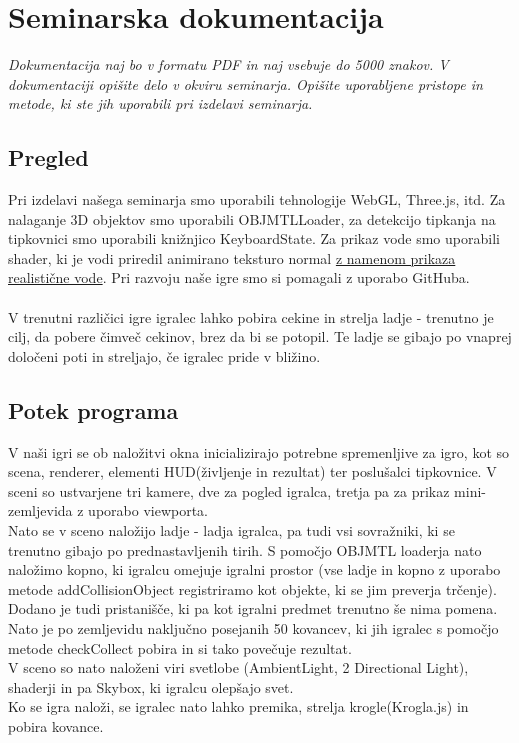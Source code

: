 \documentclass[a4paper]{article}
\begin{document}
\section{Seminarska dokumentacija}
\textit{Dokumentacija naj bo v formatu PDF in naj vsebuje do 5000 znakov. V dokumentaciji opišite delo v okviru seminarja. Opišite uporabljene pristope in metode, ki ste jih uporabili pri izdelavi seminarja. }

\subsection{Pregled}
Pri izdelavi našega seminarja smo uporabili tehnologije WebGL, Three.js\cite{wiki:Three.js}, itd. Za nalaganje 3D objektov smo uporabili OBJMTLLoader, za detekcijo tipkanja na tipkovnici smo uporabili knižnjico KeyboardState. Za prikaz vode smo uporabili shader, ki je vodi priredil animirano teksturo normal \href{http://github.com/jbouny/ocean}{z namenom prikaza realistične vode}.
Pri razvoju naše igre smo si pomagali z uporabo GitHuba. \\
\\
V trenutni različici igre igralec lahko pobira cekine in strelja ladje - trenutno je cilj, da pobere čimveč cekinov, brez da bi se potopil. Te ladje se gibajo po vnaprej določeni poti in streljajo, če igralec pride v bližino.


\subsection{Potek programa}
V naši igri se ob naložitvi okna inicializirajo potrebne spremenljive za igro, kot so scena, renderer, elementi HUD(življenje in rezultat) ter poslušalci tipkovnice. V sceni so ustvarjene tri kamere, dve za pogled igralca, tretja pa za prikaz mini-zemljevida z uporabo viewporta. \\
Nato se v sceno naložijo ladje - ladja igralca, pa tudi vsi sovražniki, ki se trenutno gibajo po prednastavljenih tirih. S pomočjo OBJMTL loaderja nato naložimo kopno, ki igralcu omejuje igralni prostor (vse ladje in kopno z uporabo metode addCollisionObject registriramo kot objekte, ki se jim preverja trčenje). Dodano je tudi pristanišče, ki pa kot igralni predmet trenutno še nima pomena. Nato je po zemljevidu naključno posejanih 50 kovancev, ki jih igralec s pomočjo metode checkCollect pobira in si tako povečuje rezultat. \\
V sceno so nato naloženi viri svetlobe (AmbientLight, 2 Directional Light), shaderji in pa Skybox, ki igralcu olepšajo svet.\\
Ko se igra naloži, se igralec nato lahko premika, strelja krogle(Krogla.js) in pobira kovance.
\end{document}
